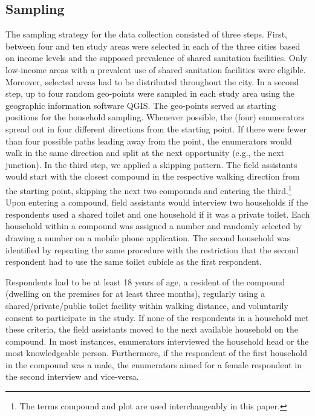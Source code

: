 \documentclass[natbib]{svjour3}                     %
\begin{document}
\subsection{Sampling}
\label{sec:sampling}
The sampling strategy for the data collection consisted of three steps. First, between four and ten study areas were selected in each of the three cities based on income levels and the supposed prevalence of shared sanitation facilities. Only low-income areas with a prevalent use of shared sanitation facilities were eligible. Moreover, selected areas had to be distributed throughout the city. In a second step, up to four random geo-points were sampled in each study area using the geographic information software QGIS. The geo-points served as starting positions for the household sampling. Whenever possible, the (four) enumerators spread out in four different directions from the starting point. If there were fewer than four possible paths leading away from the point, the enumerators would walk in the same direction and split at the next opportunity (e.g., the next junction). In the third step, we applied a skipping pattern. The field assistants would start with the closest compound in the respective walking direction from the starting point, skipping the next two compounds and entering the third.\footnote{The terms compound and plot are used interchangeably in this paper.} Upon entering a compound, field assistants would interview two households if the respondents used a shared toilet and one household if it was a private toilet. Each household within a compound was assigned a number and randomly selected by drawing a number on a mobile phone application. The second household was identified by repeating the same procedure with the restriction that the second respondent had to use the same toilet cubicle as the first respondent. 

Respondents had to be at least 18 years of age, a resident of the compound (dwelling on the premises for at least three months), regularly using a shared/private/public toilet facility within walking distance, and voluntarily consent to participate in the study. If none of the respondents in a household met these criteria, the field assistants moved to the next available household on the compound. In most instances, enumerators interviewed the household head or the most knowledgeable person. Furthermore, if the respondent of the first household in the compound was a male, the enumerators aimed for a female respondent in the second interview and vice-versa.
\end{document}

